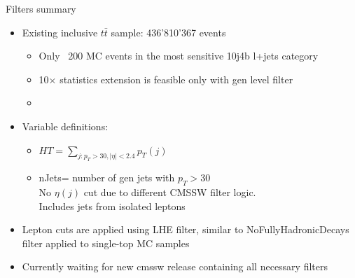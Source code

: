 \documentclass{beamer}
\begin{document}
\begin{frame}{Filters summary }

\begin{itemize}
\item Existing inclusive $t\bar{t}$ sample: 436'810'367 events
\begin{itemize}
\item Only ~200 MC events in the most sensitive 10j4b l+jets category
\item 10$\times$ statistics extension is feasible only with gen level filter
\item 
\end{itemize}
\end{itemize}

\begin{itemize}
\item Variable definitions:
\begin{itemize}
\item $HT=\sum\limits_{j:p_T>30,|\eta|<2.4} {p_T(j)}$
\item nJets= number of gen jets with $p_T>30$\\
No $\eta(j)$ cut due to different CMSSW filter logic.\\
Includes jets from isolated leptons
\end{itemize}
\item Lepton cuts are applied using LHE filter, similar to NoFullyHadronicDecays filter applied to single-top MC samples
\end{itemize}
\begin{itemize}
\item Currently waiting for new cmssw release containing all necessary filters
\end{itemize}

\end{frame}
\end{document}
